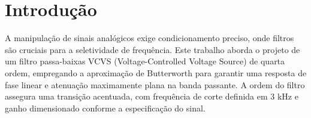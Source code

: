\section{Introdução}

A manipulação de sinais analógicos exige condicionamento preciso, onde filtros são cruciais para a seletividade de frequência. Este trabalho aborda o projeto de um filtro passa-baixas VCVS (Voltage-Controlled Voltage Source) de quarta ordem, empregando a aproximação de Butterworth para garantir uma resposta de fase linear e atenuação maximamente plana na banda passante. A ordem do filtro assegura uma transição acentuada, com frequência de corte definida em 3 kHz e ganho dimensionado conforme a especificação do sinal.